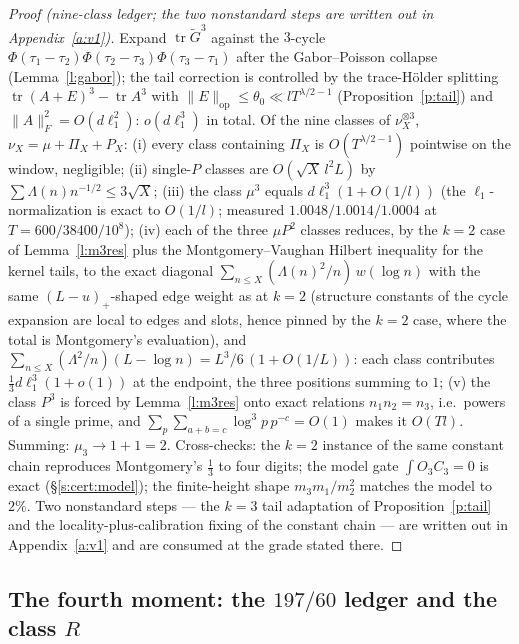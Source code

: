 \documentclass[11pt]{article}
\numberwithin{equation}{section}
\theoremstyle{definition}
\theoremstyle{remark}
\newcommand{\LL}{\Lambda}
\begin{document}
\begin{proof}[Proof (nine-class ledger; the two nonstandard
steps are written out in Appendix~\ref{a:v1})]
Expand $\operatorname{tr}\widetilde G^{3}$ against the $3$-cycle
$\Phi(\tau_1-\tau_2)\Phi(\tau_2-\tau_3)\Phi(\tau_3-\tau_1)$ after
the Gabor--Poisson collapse (Lemma~\ref{l:gabor}); the tail
correction is controlled by the trace-H\"older splitting
$\operatorname{tr}(A+E)^3-\operatorname{tr}A^3$ with
$\|E\|_{\mathrm{op}}\le\theta_0\ll lT^{\lambda/2-1}$
(Proposition~\ref{p:tail}) and $\|A\|_F^2=O(d\ell_1^2)$:
$o(d\ell_1^3)$ in total. Of the nine classes of
$\nu_X^{\otimes3}$, $\nu_X=\mu+\Pi_X+P_X$: (i) every class
containing $\Pi_X$ is $O(T^{\lambda/2-1})$ pointwise on the
window, negligible; (ii) single-$P$ classes are
$O(\sqrt X\,l^{2}L)$ by $\sum\LL(n)n^{-1/2}\le3\sqrt X$; (iii)
the class $\mu^3$ equals $d\ell_1^3(1+O(1/l))$ (the
$\ell_1$-normalization is exact to $O(1/l)$; measured
$1.0048/1.0014/1.0004$ at $T=600/38400/10^{8}$); (iv) each of
the three $\mu P^2$ classes reduces, by the $k=2$ case of
Lemma~\ref{l:m3res} plus the Montgomery--Vaughan Hilbert
inequality for the kernel tails, to the exact diagonal
$\sum_{n\le X}(\LL(n)^2/n)\,w(\log n)$ with the same
$(L-u)_+$-shaped edge weight as at $k=2$ (structure constants of
the cycle expansion are local to edges and slots, hence pinned by
the $k=2$ case, where the total is Montgomery's evaluation), and
$\sum_{n\le X}(\LL^2/n)(L-\log n)=L^3/6\,(1+O(1/L))$: each class
contributes $\tfrac13d\ell_1^3(1+o(1))$ at the endpoint, the
three positions summing to $1$; (v) the class $P^3$ is forced by
Lemma~\ref{l:m3res} onto exact relations $n_1n_2=n_3$, i.e.\
powers of a single prime, and $\sum_p\sum_{a+b=c}\log^3p\,p^{-c}
=O(1)$ makes it $O(Tl)$. Summing: $\mu_3\to1+1=2$. Cross-checks:
the $k=2$ instance of the same constant chain reproduces
Montgomery's $\tfrac13$ to four digits; the model gate
$\int O_3C_3=0$ is exact (\S\ref{s:cert:model}); the
finite-height shape $m_3m_1/m_2^2$ matches the model to $2\%$.
Two nonstandard steps --- the $k=3$ tail adaptation of
Proposition~\ref{p:tail} and the locality-plus-calibration fixing of
the constant chain --- are written out in
Appendix~\ref{a:v1} and are consumed at the grade stated
there.
\end{proof}

\subsection{The fourth moment: the $197/60$ ledger and the class
$R$}\label{s:cert:R}
\end{document}
